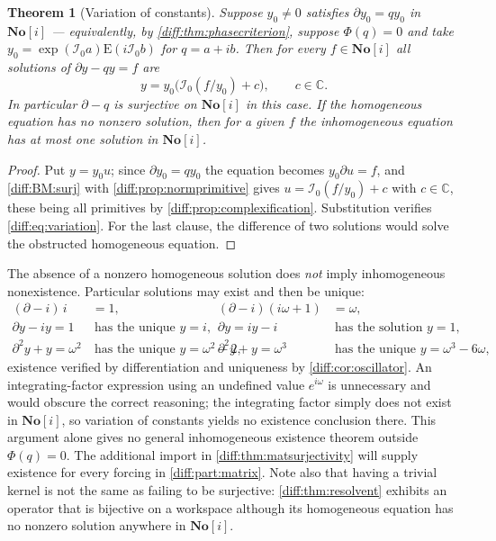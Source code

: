 \documentclass[11pt,letterpaper]{article}
\numberwithin{equation}{section}
\newtheorem{theorem}{Theorem}[section]
\theoremstyle{definition}
\theoremstyle{remark}
\newcommand{\SC}{\mathbf{No}[i]}
\newcommand{\C}{\mathbb C}
\newcommand{\der}{\partial}
\newcommand{\Izero}{\mathcal I_{0}}
\newcommand{\Emm}{\mathrm{E}}
\begin{document}
\begin{theorem}[Variation of constants]
\label{diff:thm:variation}
Suppose $y_{0}\neq0$ satisfies $\der y_{0}=qy_{0}$ in $\SC$ --- equivalently,
by \cref{diff:thm:phasecriterion}, suppose $\Phi(q)=0$ and take
$y_{0}=\exp(\Izero a)\Emm(i\Izero b)$ for $q=a+ib$. Then for every $f\in\SC$
all solutions of $\der y-qy=f$ are
\begin{equation}\label{diff:eq:variation}
 y=y_{0}\bigl(\Izero(f/y_{0})+c\bigr),\qquad c\in\C .
\end{equation}
In particular $\der-q$ is surjective on $\SC$ in this case. If the homogeneous
equation has no nonzero solution, then for a given $f$ the inhomogeneous
equation has \emph{at most one} solution in $\SC$.
\end{theorem}
\begin{proof}
Put $y=y_{0}u$; since $\der y_{0}=qy_{0}$ the equation becomes
$y_{0}\der u=f$, and \ref{diff:BM:surj} with
\cref{diff:prop:normprimitive} gives $u=\Izero(f/y_{0})+c$ with $c\in\C$, these
being all primitives by \cref{diff:prop:complexification}. Substitution
verifies \cref{diff:eq:variation}. For the last clause, the difference of two
solutions would solve the obstructed homogeneous equation.
\end{proof}

\begin{warning}
\label{diff:warn:atmostone}
The absence of a nonzero homogeneous solution does \emph{not} imply
inhomogeneous nonexistence. Particular solutions may exist and then be unique:
\begin{align*}
 (\der-i)\,i&=1, &
 (\der-i)(i\omega+1)&=\omega,\\
 \der y-iy=1
 &\ \text{has the unique } y=i, &
 \der y=iy-i
 &\ \text{has the solution } y=1,\\
 \der^{2}y+y=\omega^{2}
 &\ \text{has the unique } y=\omega^{2}-2, &
 \der^{2}y+y=\omega^{3}
 &\ \text{has the unique } y=\omega^{3}-6\omega,
\end{align*}
existence verified by differentiation and uniqueness by
\cref{diff:cor:oscillator}. An integrating-factor expression using an
undefined value $e^{i\omega}$ is unnecessary and would obscure the correct
reasoning; the integrating factor simply does not exist in $\SC$, so variation
of constants yields no existence conclusion there. This argument alone gives
no general inhomogeneous existence theorem outside $\Phi(q)=0$. The additional
import in \cref{diff:thm:matsurjectivity} will supply existence for every
forcing in \cref{diff:part:matrix}. Note also that having a trivial kernel is not the
same as failing to be surjective: \cref{diff:thm:resolvent} exhibits an
operator that is bijective on a workspace although its homogeneous equation
has no nonzero solution anywhere in $\SC$.
\end{warning}
\end{document}

